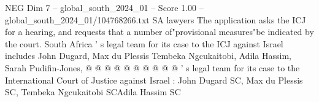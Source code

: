 \begin{textsample}{NEG Dim 7 – global\_south\_2024\_01 – Score 1.00 – global\_south\_2024\_01/104768266.txt}
SA lawyers The application asks the ICJ for a hearing, and requests that a number of"provisional measures"be indicated by the court.
South Africa ' s legal team for its case to the ICJ against Israel includes John Dugard, Max du Plessis Tembeka Ngcukaitobi, Adila Hassim, Sarah Pudifin-Jones, @ @ @ @ @ @ @ @ @ @ ' s legal team for its case to the International Court of Justice against Israel : John Dugard SC, Max du Plessis SC, Tembeka Ngcukaitobi SCAdila Hassim SC

\end{textsample}
